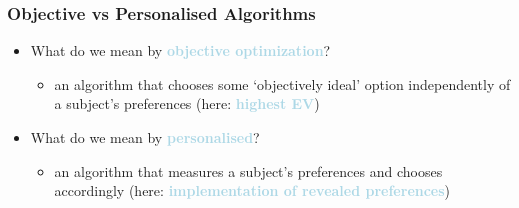 \documentclass[xcolor=dvipsnames, 10pt]{beamer}
\begin{document}
   \begin{frame}
	\frametitle{Objective vs Personalised Algorithms}%
	\begin{itemize}
	\setlength\itemsep{1em}
  \item What do we mean by \textcolor{lightblue}{\textbf{objective optimization}}?%
  \begin{itemize}
   \item an algorithm that chooses some ‘objectively ideal’ option independently of a subject’s preferences (here: \textcolor{lightblue}{\textbf{highest EV}})\vspace{-.2cm}
  \end{itemize}
  \item What do we mean by \textcolor{lightblue}{\textbf{personalised}}?%
  \begin{itemize}
   \item an algorithm that measures a subject’s preferences and chooses accordingly (here: \textcolor{lightblue}{\textbf{implementation of revealed preferences}})\vspace{-.2cm}
  \end{itemize}
 \end{itemize}
\end{frame}
\end{document}

